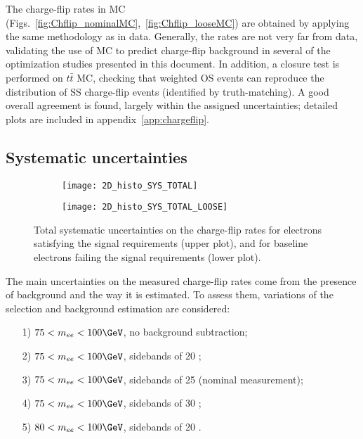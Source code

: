 The charge-flip rates in MC (Figs.~\ref{fig:Chflip_nominalMC},~\ref{fig:Chflip_looseMC}) 
are obtained by applying the same methodology as in data. 
Generally, the rates are not very far from data, validating the use of MC to predict charge-flip background 
in several of the optimization studies presented in this document. 
In addition, a closure test is performed on $t\bar t$ MC, 
checking that weighted OS events can reproduce the distribution of SS charge-flip events (identified by truth-matching). 
A good overall agreement is found, largely within the assigned uncertainties; 
detailed plots are included in appendix~\ref{app:chargeflip}. 

\subsection{Systematic uncertainties}
\label{subsec:chargeflip_uncertainties}

\begin{figure}[t!]
\centering
\begin{subfigure}[b]{0.75\textwidth}
	\texttt{[image: 2D\_histo\_SYS\_TOTAL]}
\end{subfigure}
\begin{subfigure}[b]{0.75\textwidth}
	\texttt{[image: 2D\_histo\_SYS\_TOTAL\_LOOSE]}
\end{subfigure}
\caption{Total systematic uncertainties on the charge-flip rates for electrons satisfying the signal requirements (upper plot),
and for baseline electrons failing the signal requirements (lower plot). 
}
\label{fig:ChFlip_SYS_Total}
\end{figure}

The main uncertainties on the measured charge-flip rates come from the presence of background and the way it is estimated. To assess them, variations of the selection and background estimation are considered: 
\begin{itemize}
\item[1)] $75<m_{ee}<100 \GeV$, no background subtraction;
\item[2)] $75<m_{ee}<100 \GeV$, sidebands of 20 \GeV;
\item[3)] $75<m_{ee}<100 \GeV$, sidebands of 25 \GeV (nominal measurement);
\item[4)] $75<m_{ee}<100 \GeV$, sidebands of 30 \GeV;
\item[5)] $80<m_{ee}<100 \GeV$, sidebands of 20 \GeV.
\end{itemize}

